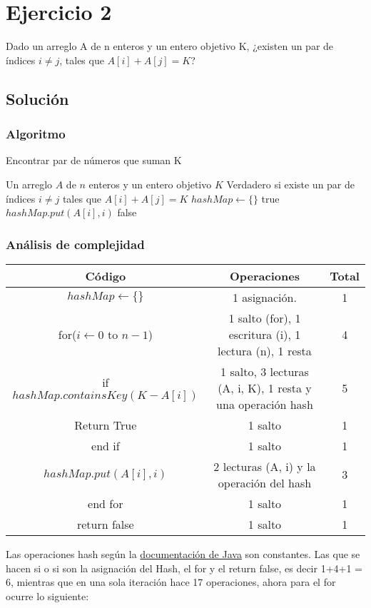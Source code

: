 \section{Ejercicio 2}
Dado un arreglo A de n enteros y un entero objetivo K, ¿existen un par de índices $i \neq j$, tales que $A[i] + A[j] = K$?

\subsection*{Solución}
\subsubsection*{Algoritmo}
\begin{algorithm}[H]
\caption{Encontrar par de números que suman K}
\begin{algorithmic}[1]
\REQUIRE Un arreglo $A$ de $n$ enteros y un entero objetivo $K$
\ENSURE Verdadero si existe un par de índices $i \neq j$ tales que $A[i] + A[j] = K$
\STATE $hashMap \gets \{\}$
        \RETURN true
    \ENDIF
    \STATE $hashMap.put(A[i], i)$
\ENDFOR
\RETURN false
\end{algorithmic}
\end{algorithm}

\subsubsection*{Análisis de complejidad}
\begin{tabular}{|c|c|c|}
  \hline
  Código & Operaciones & Total \\
  \hline
 $hashMap \gets \{\}$    & 1 asignación.   & 1 \\
  \hline
  for($i \gets 0$ to $n-1$)    & 1 salto (for), 1 escritura (i), 1 lectura (n), 1 resta & 4    \\
  \hline
  if $hashMap.containsKey(K - A[i])$ & 1 salto, 3 lecturas (A, i, K), 1 resta y una operación hash& 5 \\
  \hline
  Return True & 1 salto & 1 \\
  \hline
  end if & 1 salto & 1 \\
  \hline
  $hashMap.put(A[i], i)$ & 2 lecturas (A, i) y la operación del hash & 3 \\
  \hline
  end for & 1 salto & 1 \\
  \hline
  return false & 1 salto & 1
\end{tabular}
Las operaciones hash según la \href{https://docs.oracle.com/javase/8/docs/api/java/util/HashMap.html}{documentación de Java} son constantes.
Las que se hacen si o si son la asignación del Hash, el for y el return false, es decir 1+4+1 = 6, mientras que en una sola iteración hace 17 operaciones, ahora para el for ocurre lo siguiente:

